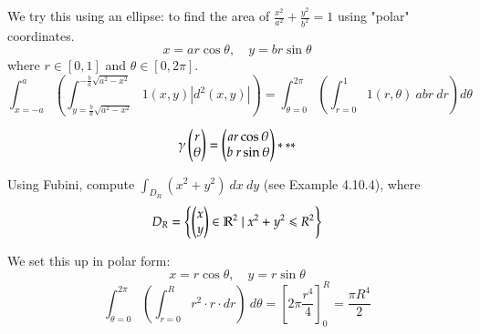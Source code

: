 We try this using an ellipse: to find the area of $\frac{x^2}{a^2}+\frac{y^2}{b^2}=1$ using "polar" coordinates. 
\[x=ar\cos \theta,\quad y=br\sin\theta\]
where $r\in [0,1]$ and $\theta \in [0,2\pi]$. 
\[ \int_{x=-a}^{a}
\left( \int_{y=\frac{b}{a} \sqrt{a^2-x^2}}^{-\frac{b}{a} \sqrt{a^2-x^2}} 1(x,y)\left|d^2(x,y) \right| \right) = \int_{\theta = 0}^{2\pi} \left(\int_{r=0}^{1} 1(r,\theta)\ abr\ dr\right) d\theta\]

\[\gamma\begin{pmatrix} r \\ \theta \end{pmatrix} = \begin{pmatrix} a r \cos \theta \\ b\ r\sin\theta \end{pmatrix} ***\]

 Using Fubini, compute $\int_{D_R}(x^2+y^2)\ dx\ dy$ (see Example 4.10.4), where
\[D_R = \left\{ \begin{pmatrix} x \\ y \end{pmatrix}\in \mathbb{R}^2 \mid x^2+y^2 \leqslant R^2 \right\} \]

We set this up in polar form: 
\[x = r\cos \theta, \quad y = r\sin \theta\]
\[\int_{\theta = 0}^{2\pi} \left( \int_{r=0}^R r^2\cdot r\cdot dr\right)\ d\theta = \left[2\pi \frac{r^4}{4}\right]_0^R = \frac{\pi R^4}{2}\]